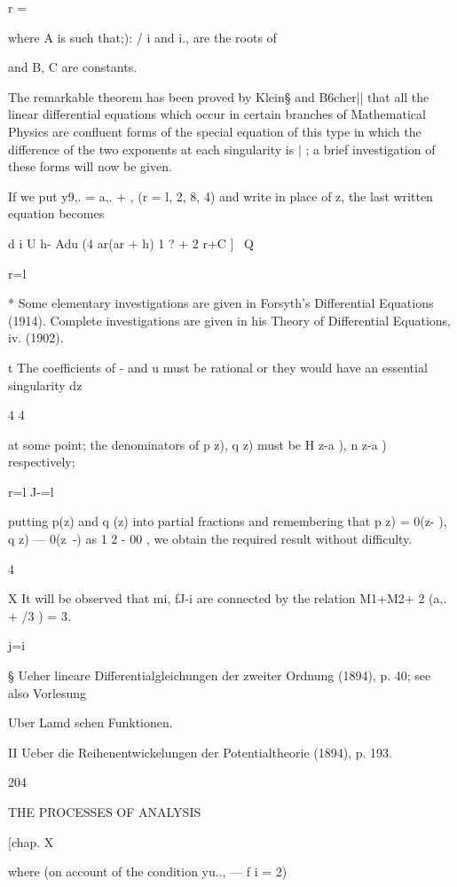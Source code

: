 r = \

where A is such that;): / i and i., are the roots of



and B, C are constants.

The remarkable theorem has been proved by Klein§ and B6cher|| that all
the linear differential equations which occur in certain branches of
Mathematical Physics are confluent forms of the special equation of
this type in which the difference of the two exponents at each
singularity is | ; a brief investigation of these forms will now be
given.

If we put y9,. = a,. + , (r = l, 2, 8, 4) and write in place of z, the
last written equation becomes

d i U h- Adu (4 ar(ar + h) 1 ? + 2 r+C ] \ Q

r=l

* Some elementary investigations are given in Forsyth's Differential
Equations (1914). Complete investigations are given in his Theory of
Differential Equations, iv. (1902).

t The coefficients of - and u must be rational or they would have an
essential singularity dz

4 4

at some point; the denominators of p z), q z) must be H z-a ), n z-a )
respectively;

r=l J-=l

putting p(z) and q (z) into partial fractions and remembering that p
z) = 0(z- ), q z) — 0(z~-) as 1 2 - 00 , we obtain the required result
without difficulty.

4

X It will be observed that mi, fJ-i are connected by the relation
M1+M2+ 2 (a,. + /3 ) = 3.

j=i

§ Ueher lineare Differentialgleichungen der zweiter Ordnung (1894), p.
40; see also Vorlesung

Uber Lamd schen Funktionen.

II Ueber die Reihenentwickelungen der Potentialtheorie (1894), p. 193.



204



THE PROCESSES OF ANALYSIS



[chap. X



where (on account of the condition yu.., — f i = 2)



